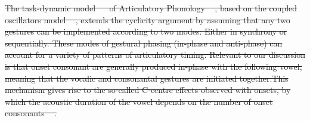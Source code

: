 \documentclass[12pt,a4paper,]{article}
\providecommand{\DIFdeltex}[1]{{\protect\color{red}\sout{#1}}}                      %
\providecommand{\DIFdelbegin}{} %
\providecommand{\DIFdel}[1]{\texorpdfstring{\DIFdeltex{#1}}{}} %
\newcommand{\DIFscaledelfig}{0.5}
\newlength{\DIFdelgraphicswidth} %
\newlength{\DIFdelgraphicsheight} %
\newcommand{\DIFdelincludegraphics}[2][]{%
\sbox{\DIFdelgraphicsbox}{\DIFOincludegraphics[#1]{#2}}%
\settoboxwidth{\DIFdelgraphicswidth}{\DIFdelgraphicsbox} %
\settoboxtotalheight{\DIFdelgraphicsheight}{\DIFdelgraphicsbox} %
\scalebox{\DIFscaledelfig}{%
\parbox[b]{\DIFdelgraphicswidth}{\usebox{\DIFdelgraphicsbox}\\[-\baselineskip] \rule{\DIFdelgraphicswidth}{0em}}\llap{\resizebox{\DIFdelgraphicswidth}{\DIFdelgraphicsheight}{%
\setlength{\unitlength}{\DIFdelgraphicswidth}%
\begin{picture}(1,1)%
\thicklines\linethickness{2pt} %
{\color[rgb]{1,0,0}\put(0,0){\framebox(1,1){}}}%
{\color[rgb]{1,0,0}\put(0,0){\line( 1,1){1}}}%
{\color[rgb]{1,0,0}\put(0,1){\line(1,-1){1}}}%
\end{picture}%
}\hspace*{3pt}}} %
} %
\DeclareRobustCommand{\DIFdelbegin}{\DIFOdelbegin \let\includegraphics\DIFdelincludegraphics} %
\begin{document}
\DIFdelbegin \DIFdel{The task-dynamic model \mbox{%
\citep{saltzman2008} }\hspace{0pt}%
of Articulatory Phonology
\mbox{%
\citep{ohala1986a, browman1988, browman1992}}\hspace{0pt}%
, based on the coupled
oscillators model \mbox{%
\citep{odell2008}}\hspace{0pt}%
, extends the cyclicity argument by assuming that any two gestures can be implemented according to
two
modes: Either in synchrony or sequentially. These modes of gestural
phasing (in-phase and anti-phase) can account for a variety of patterns
of articulatory timing. Relevant to
our discussion is that onset
consonant are generally produced in-phase with the following vowel,
meaning that the vocalic and consonantal gestures are initiated
together.This mechanism gives rise to the so-called C-centre effects
observed with onsets, by which the acoustic duration of the vowel
depends on the number of onset consonants
\mbox{%
\citep{browman1988, marin2010, hermes2013, marin2014}}\hspace{0pt}%
.
}%
\end{document}
